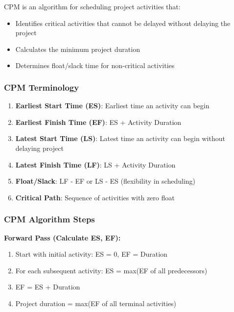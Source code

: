 \documentclass[
  letterpaper,
  DIV=11,
  numbers=noendperiod]{scrreprt}
\providecommand{\tightlist}{%
  \setlength{\itemsep}{0pt}\setlength{\parskip}{0pt}}
\begin{document}
CPM is an algorithm for scheduling project activities that:

\begin{itemize}
\tightlist
\item
  Identifies critical activities that cannot be delayed without delaying
  the project
\item
  Calculates the minimum project duration
\item
  Determines float/slack time for non-critical activities
\end{itemize}

\subsubsection{CPM Terminology}\label{cpm-terminology}

\begin{enumerate}
\def\labelenumi{\arabic{enumi}.}
\tightlist
\item
  \textbf{Earliest Start Time (ES)}: Earliest time an activity can begin
\item
  \textbf{Earliest Finish Time (EF)}: ES + Activity Duration
\item
  \textbf{Latest Start Time (LS)}: Latest time an activity can begin
  without delaying project
\item
  \textbf{Latest Finish Time (LF)}: LS + Activity Duration
\item
  \textbf{Float/Slack}: LF - EF or LS - ES (flexibility in scheduling)
\item
  \textbf{Critical Path}: Sequence of activities with zero float
\end{enumerate}

\subsubsection{CPM Algorithm Steps}\label{cpm-algorithm-steps}

\textbf{Forward Pass (Calculate ES, EF):}

\begin{enumerate}
\def\labelenumi{\arabic{enumi}.}
\tightlist
\item
  Start with initial activity: ES = 0, EF = Duration
\item
  For each subsequent activity: ES = max(EF of all predecessors)
\item
  EF = ES + Duration
\item
  Project duration = max(EF of all terminal activities)
\end{enumerate}
\end{document}
